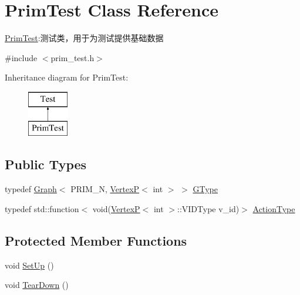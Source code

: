 \hypertarget{class_prim_test}{}\section{Prim\+Test Class Reference}
\label{class_prim_test}


\hyperlink{class_prim_test}{Prim\+Test}\+:测试类，用于为测试提供基础数据  




{\ttfamily \#include $<$prim\+\_\+test.\+h$>$}

Inheritance diagram for Prim\+Test\+:\begin{figure}[H]
\begin{center}
\leavevmode
\includegraphics[height=2.000000cm]{class_prim_test}
\end{center}
\end{figure}
\subsection*{Public Types}
\begin{DoxyCompactItemize}
\item 
typedef \hyperlink{struct_introduction_to_algorithm_1_1_graph_algorithm_1_1_graph}{Graph}$<$ P\+R\+I\+M\+\_\+\+N, \hyperlink{struct_introduction_to_algorithm_1_1_graph_algorithm_1_1_vertex_p}{Vertex\+P}$<$ int $>$ $>$ \hyperlink{class_prim_test_a007bd8e1bdac3f8548d0a4bebce87881}{G\+Type}
\item 
typedef std\+::function$<$ void(\hyperlink{struct_introduction_to_algorithm_1_1_graph_algorithm_1_1_vertex_p}{Vertex\+P}$<$ int $>$\+::V\+I\+D\+Type v\+\_\+id)$>$ \hyperlink{class_prim_test_a834237db99fdb38480aa6ba46b509e9e}{Action\+Type}
\end{DoxyCompactItemize}
\subsection*{Protected Member Functions}
\begin{DoxyCompactItemize}
\item 
void \hyperlink{class_prim_test_a9f2e77a9785f9ae04e8c3ea72fb6b127}{Set\+Up} ()
\item 
void \hyperlink{class_prim_test_a5894c9275a0bfda59f7b5661ece6b984}{Tear\+Down} ()
\end{DoxyCompactItemize}

